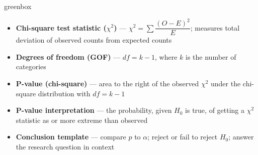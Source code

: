 \documentclass[10pt]{article}
\begin{document}
\begin{skillbox}{greenbox}
\begin{minipage}[t]{0.48\linewidth}
    \begin{itemize}
        \item \textbf{Chi-square test statistic ($\chi^2$)} ---
              $\chi^2 = \sum \dfrac{(O - E)^2}{E}$; measures total deviation of
              observed counts from expected counts
        \item \textbf{Degrees of freedom (GOF)} --- $df = k - 1$, where $k$ is
              the number of categories
    \end{itemize}
\end{minipage}
\hfill
\begin{minipage}[t]{0.48\linewidth}
    \begin{itemize}
        \item \textbf{P-value (chi-square)} --- area to the right of the observed
              $\chi^2$ under the chi-square distribution with $df = k - 1$
        \item \textbf{P-value interpretation} --- the probability, given $H_0$ is
              true, of getting a $\chi^2$ statistic as or more extreme than observed
        \item \textbf{Conclusion template} --- compare $p$ to $\alpha$; reject or
              fail to reject $H_0$; answer the research question in context
    \end{itemize}
\end{minipage}
\end{skillbox}
\end{document}
